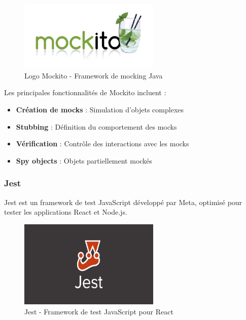 \documentclass[12pt,a4paper]{report}
\begin{document}
\begin{figure}[htbp]
    \centering
    \includegraphics[width=0.6\textwidth]{latex_media/media/mockito.png}
    \caption{Logo Mockito - Framework de mocking Java}
    \label{fig:mockito-logo}
\end{figure}

Les principales fonctionnalités de Mockito incluent :
\begin{itemize}
    \item \textbf{Création de mocks} : Simulation d'objets complexes
    \item \textbf{Stubbing} : Définition du comportement des mocks
    \item \textbf{Vérification} : Contrôle des interactions avec les mocks
    \item \textbf{Spy objects} : Objets partiellement mockés
\end{itemize}

\subsubsection{Jest}

Jest est un framework de test JavaScript développé par Meta, optimisé pour tester les applications React et Node.js.

\begin{figure}[htbp]
    \centering
    \includegraphics[width=0.6\textwidth]{latex_media/media/jest_react_test.png}
    \caption{Jest - Framework de test JavaScript pour React}
    \label{fig:jest-logo}
\end{figure}
\end{document}
